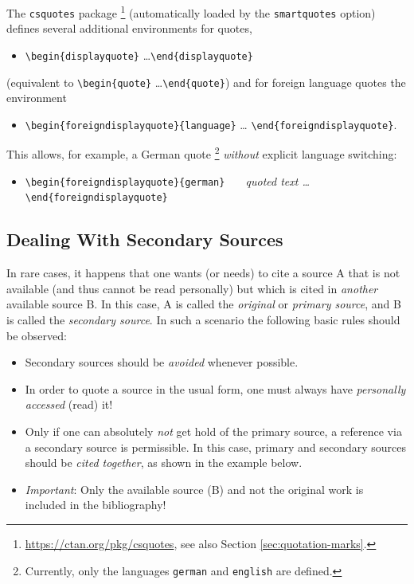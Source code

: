The \texttt{csquotes} package%
\footnote{\url{https://ctan.org/pkg/csquotes}, see also Section
\ref{sec:quotation-marks}.}
(automatically loaded by the \texttt{smartquotes} option) defines several
additional environments for quotes, \eg
%
\begin{itemize}
    \item[] \verb!\begin{displayquote}! \ldots \verb!\end{displayquote}!
\end{itemize}
%
(equivalent to \verb!\begin{quote}! \ldots \verb!\end{quote}!) and for foreign
language quotes the environment
%
\begin{itemize}
    \item[] \verb!\begin{foreigndisplayquote}{language}! \ldots
    \verb!\end{foreigndisplayquote}!.
\end{itemize}
%
This allows, for example, a German quote%
\footnote{Currently, only the languages \texttt{german} and \texttt{english}
are defined.}
\emph{without} explicit language switching:
%
\begin{itemize}
    \item[] \verb!\begin{foreigndisplayquote}{german}!\newline
       \verb!   !\emph{quoted text \ldots}\newline
    \verb!\end{foreigndisplayquote}!
\end{itemize}

\subsection{Dealing With Secondary Sources}

In rare cases, it happens that one wants (or needs) to cite a source \textrm{A}
that is not available (and thus cannot be read personally) but which is cited in
\emph{another} available source \textrm{B}. In this case, \textrm{A} is called
the \emph{original} or \emph{primary source}, and \textrm{B} is called the
\emph{secondary source}. In such a scenario the following basic rules should be
observed:
%
\begin{itemize}
    \item Secondary sources should be \emph{avoided} whenever
    possible.
    \item In order to quote a source in the usual form, one must always have
    \emph{personally accessed} (read) it!
    \item Only if one can absolutely \emph{not} get hold of the primary source, a
    reference via a secondary source is permissible. In this case, primary and
    secondary sources should be \emph{cited together}, as shown in the example
    below.
    \item \emph{Important}: Only the available source (\textrm{B}) and not
    the original work is included in the bibliography!
\end{itemize}
%
